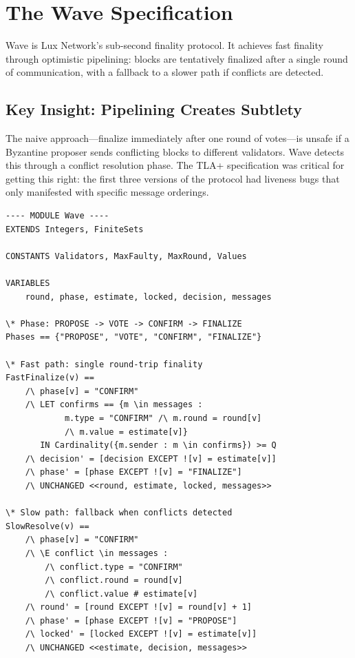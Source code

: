 \section{The Wave Specification}


Wave is Lux Network's sub-second finality protocol. It achieves fast finality through
optimistic pipelining: blocks are tentatively finalized after a single round of
communication, with a fallback to a slower path if conflicts are detected.

\subsection{Key Insight: Pipelining Creates Subtlety}

The naive approach---finalize immediately after one round of votes---is unsafe if a
Byzantine proposer sends conflicting blocks to different validators. Wave detects this
through a conflict resolution phase. The TLA+ specification was critical for getting
this right: the first three versions of the protocol had liveness bugs that only
manifested with specific message orderings.

\begin{lstlisting}[language=TLA,caption={Wave specification excerpt}]
---- MODULE Wave ----
EXTENDS Integers, FiniteSets

CONSTANTS Validators, MaxFaulty, MaxRound, Values

VARIABLES
    round, phase, estimate, locked, decision, messages

\* Phase: PROPOSE -> VOTE -> CONFIRM -> FINALIZE
Phases == {"PROPOSE", "VOTE", "CONFIRM", "FINALIZE"}

\* Fast path: single round-trip finality
FastFinalize(v) ==
    /\ phase[v] = "CONFIRM"
    /\ LET confirms == {m \in messages :
            m.type = "CONFIRM" /\ m.round = round[v]
            /\ m.value = estimate[v]}
       IN Cardinality({m.sender : m \in confirms}) >= Q
    /\ decision' = [decision EXCEPT ![v] = estimate[v]]
    /\ phase' = [phase EXCEPT ![v] = "FINALIZE"]
    /\ UNCHANGED <<round, estimate, locked, messages>>

\* Slow path: fallback when conflicts detected
SlowResolve(v) ==
    /\ phase[v] = "CONFIRM"
    /\ \E conflict \in messages :
        /\ conflict.type = "CONFIRM"
        /\ conflict.round = round[v]
        /\ conflict.value # estimate[v]
    /\ round' = [round EXCEPT ![v] = round[v] + 1]
    /\ phase' = [phase EXCEPT ![v] = "PROPOSE"]
    /\ locked' = [locked EXCEPT ![v] = estimate[v]]
    /\ UNCHANGED <<estimate, decision, messages>>
\end{lstlisting}

